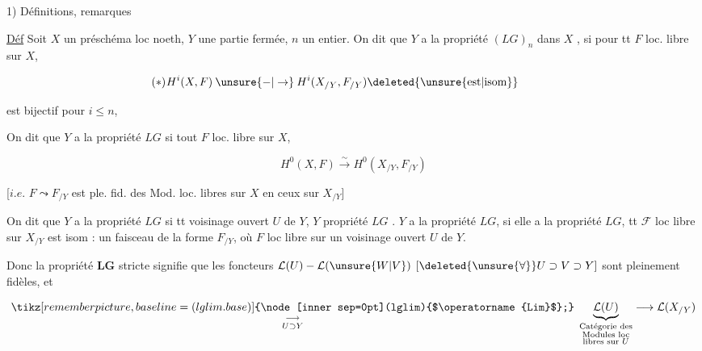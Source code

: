 1) Définitions, remarques

\uline{Déf} Soit $X$ un préschéma loc noeth, $Y$ une partie fermée, $n$ un entier. On dit que $Y$ a la propriété $(LG)_n$ dans $X$ , si pour tt $F$ loc. libre sur $X$,

\[
H^i(X,F)\mathbin{\unsure{-|\to}}H^i(X_{/Y},F_{/Y})\deleted{\unsure{\mathrm{est}|\mathrm{isom}}}
\tag*{\makebox[0pt][r]{\makebox[\linewidth][l]{$(\ast)$}}}
\]

est bijectif pour $i\leq n$, 

On dit que $Y$ a la propriété $LG$  si   tout $F$ loc. libre sur $X$,

\[
H^0(X,F)\overset{\sim}{\longrightarrow}H^0(X_{/Y},F_{/Y})
\]

[$i.e.$ $F\leadsto F_{/Y}$ est ple. fid. des Mod. loc. libres sur $X$ en ceux sur $X_{/Y}$]

On dit que $Y$ a la propriété $LG$   si tt  voisinage ouvert $U$ de $Y$, $Y$   propriété $LG$ . \uline{} $Y$ a la propriété $LG$,   si elle a la propriété $LG$,  
tt $\mathcal F$ loc libre sur $X_{/Y}$  est isom : un faisceau de la forme $F_{/Y}$, où $F$ loc libre sur un voisinage ouvert $U$ de $Y$.

Donc la propriété \textbf{LG} stricte signifie que les foncteurs $\mathcal L(U)\mathbin{-}\mathcal L(\unsure{W|V})$ $[\deleted{\unsure{\forall}}U\supset V\supset Y]$ sont pleinement fidèles, et

\[
\underset{U\supset Y}{\underset{\longrightarrow}{\tikz[remember picture,baseline=(lglim.base)]{\node[inner sep=0pt](lglim){$\operatorname{Lim}$};}}}\;
\underbrace{\mathcal L(U)}_{\substack{\text{Catégorie des}\\\text{Modules loc}\\\text{libres sur }U}}
\longrightarrow\mathcal L(X_{/Y})
\]

